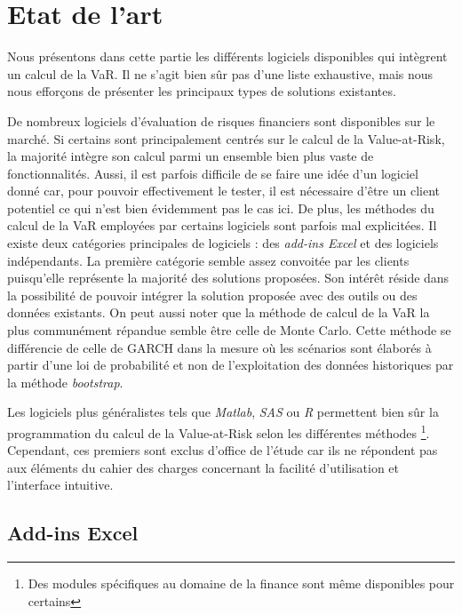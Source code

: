 \chapter{Etat de l'art}

	Nous présentons dans cette partie les différents logiciels disponibles qui intègrent un calcul de la VaR. Il ne s'agit bien sûr pas d'une liste exhaustive, mais nous nous efforçons de présenter les principaux types de solutions existantes.

	De nombreux logiciels d’évaluation de risques financiers sont disponibles sur le marché. Si certains sont principalement centrés sur le calcul de la Value-at-Risk, la majorité intègre son calcul parmi un ensemble bien plus vaste de fonctionnalités. 
	Aussi, il est parfois difficile de se faire une idée d’un logiciel donné car, pour pouvoir effectivement le tester, il est nécessaire d’être un client potentiel ce qui n'est bien évidemment pas le cas ici. De plus, les méthodes du calcul de la VaR employées par certains logiciels sont parfois mal explicitées.
	Il existe deux catégories principales de logiciels : des \textit{add-ins Excel} et des logiciels indépendants. La première catégorie semble assez convoitée par les clients puisqu'elle représente la majorité des solutions proposées. Son intérêt réside dans la possibilité de pouvoir intégrer la solution proposée avec des outils ou des données existants.
	On peut aussi noter que la méthode de calcul de la VaR la plus communément répandue semble être celle de Monte Carlo. Cette méthode se différencie de celle de GARCH dans la mesure où les scénarios sont élaborés à partir d'une loi de probabilité et non de l'exploitation des données historiques par la méthode \textit{bootstrap}.

	Les logiciels plus généralistes tels que \textit{Matlab}, \textit{SAS} ou \textit{R} permettent bien sûr la programmation du calcul de la Value-at-Risk selon les différentes méthodes \footnote{Des modules spécifiques au domaine de la finance sont même disponibles pour certains}. Cependant, ces premiers sont exclus d'office de l'étude car ils ne répondent pas aux éléments du cahier des charges concernant la facilité d'utilisation et l'interface intuitive.


	\section{Add-ins Excel}

